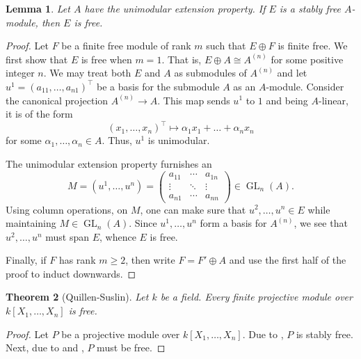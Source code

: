 \documentclass[12pt]{article}
\theoremstyle{thmstyle}
\newtheorem{theorem}{Theorem}[section]
\newtheorem{lemma}[theorem]{Lemma}
\theoremstyle{defstyle}
\newcommand{\GL}{\operatorname{GL}}
\renewcommand{\ge}{\geqslant}
\begin{document}
\begin{lemma}
    Let $A$ have the unimodular extension property. If $E$ is a stably free $A$-module, then $E$ is free.
\end{lemma}
\begin{proof}
    Let $F$ be a finite free module of rank $m$ such that $E\oplus F$ is finite free. We first show that $E$ is free when $m = 1$. That is, $E\oplus A\cong A^{(n)}$ for some positive integer $n$. We may treat both $E$ and $A$ as submodules of $A^{(n)}$ and let $u^1 = (a_{11},\dots, a_{n1})^\top$ be a basis for the submodule $A$ as an $A$-module. Consider the canonical projection $A^{(n)}\to A$. This map sends $u^1$ to $1$ and being $A$-linear, it is of the form 
    \begin{equation*}
        (x_1,\dots,x_n)^\top\mapsto \alpha_1x_1 + \dots + \alpha_nx_n
    \end{equation*}
    for some $\alpha_1,\dots,\alpha_n\in A$. Thus, $u^1$ is unimodular.

    The unimodular extension property furnishes an 
    \begin{equation*}
        M = (u^1,\dots, u^n) = \begin{pmatrix}
            a_{11} & \cdots & a_{1n}\\
            \vdots & \ddots & \vdots\\
            a_{n1} & \cdots & a_{nn}
        \end{pmatrix}
        \in\GL_n(A).
    \end{equation*}
    Using column operations, on $M$, one can make sure that $u^2,\dots, u^n\in E$ while maintaining $M\in\GL_n(A)$. Since $u^1,\dots,u^n$ form a basis for $A^{(n)}$, we see that $u^2,\dots,u^n$ must span $E$, whence $E$ is free.

    Finally, if $F$ has rank $m\ge 2$, then write $F = F'\oplus A$ and use the first half of the proof to induct downwards.
\end{proof}

\begin{theorem}[Quillen-Suslin]
    Let $k$ be a field. Every finite projective module over $k[X_1,\dots,X_n]$ is free.
\end{theorem}
\begin{proof}
    Let $P$ be a projective module over $k[X_1,\dots,X_n]$. Due to , $P$ is stably free. Next, due to  and , $P$ must be free.
\end{proof}
\end{document}
